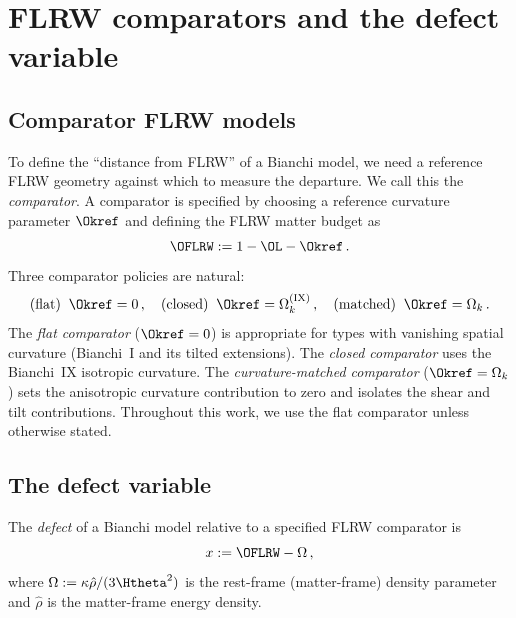 \section{FLRW comparators and the defect variable}
\label{sec:defect-def}

\subsection{Comparator FLRW models}\label{sec:comparators}

To define the ``distance from FLRW'' of a Bianchi model, we
need a reference FLRW geometry against which to measure the
departure.  We call this the \emph{comparator}.  A comparator
is specified by choosing a reference curvature parameter
$\Okref$ and defining the FLRW matter budget as
\begin{equation}\label{eq:FLRW-budget}
\OFLRW := 1 - \OL - \Okref\,.
\end{equation}
Three comparator policies are natural:
\begin{equation}\label{eq:comparator-policies}
\text{(flat)}\;\; \Okref = 0\,,\quad
\text{(closed)}\;\; \Okref = \Omega_k^{(\mathrm{IX})}\,,\quad
\text{(matched)}\;\; \Okref = \Omega_k\,.
\end{equation}
The \emph{flat comparator} ($\Okref = 0$) is appropriate for
types with vanishing spatial curvature (Bianchi~I and its
tilted extensions).  The \emph{closed comparator} uses the
Bianchi~IX isotropic curvature.  The \emph{curvature-matched
comparator} ($\Okref = \Omega_k$) sets the anisotropic
curvature contribution to zero and isolates the shear and tilt
contributions.  Throughout this work, we use the flat comparator
unless otherwise stated.


\subsection{The defect variable}\label{sec:defect-x}

\begin{definition}\label{def:defect}
The \emph{defect} of a Bianchi model relative to a specified
FLRW comparator is
\begin{equation}\label{eq:defect-def}
x := \OFLRW - \Omega\,,
\end{equation}
where $\Omega := \kappa\hat{\rho}/(3\Htheta^2)$ is the
rest-frame (matter-frame) density parameter and $\hat{\rho}$
is the matter-frame energy density.
\end{definition}

